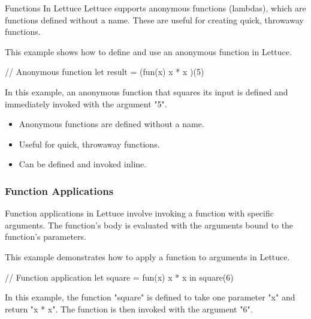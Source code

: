 \begin{notes}{Functions In Lettuce}
    Lettuce supports anonymous functions (lambdas), which are functions defined without a name. These are useful for creating quick, throwaway functions.
    
    \begin{highlight}
    
        This example shows how to define and use an anonymous function in Lettuce.
    
    \begin{code}[Lettuce]
    // Anonymous function
    let result = (fun(x) { x * x })(5)
    \end{code}
    
        In this example, an anonymous function that squares its input is defined and immediately invoked with the argument "5".
    
        \begin{itemize}
            \item Anonymous functions are defined without a name.
            \item Useful for quick, throwaway functions.
            \item Can be defined and invoked inline.
        \end{itemize}
    
    \end{highlight}
    
    \subsubsection*{Function Applications}
    
    Function applications in Lettuce involve invoking a function with specific arguments. The function's body is evaluated with the arguments bound to the function's parameters.
    
    \begin{highlight}
    
        This example demonstrates how to apply a function to arguments in Lettuce.
    
    \begin{code}[Lettuce]
    // Function application
    let square = fun(x) {
        x * x
    } in
    square(6)
    \end{code}
    
        In this example, the function "square" is defined to take one parameter "x" and return "x * x". The function is then invoked with the argument "6".
    

\end{highlight}
\end{notes}
